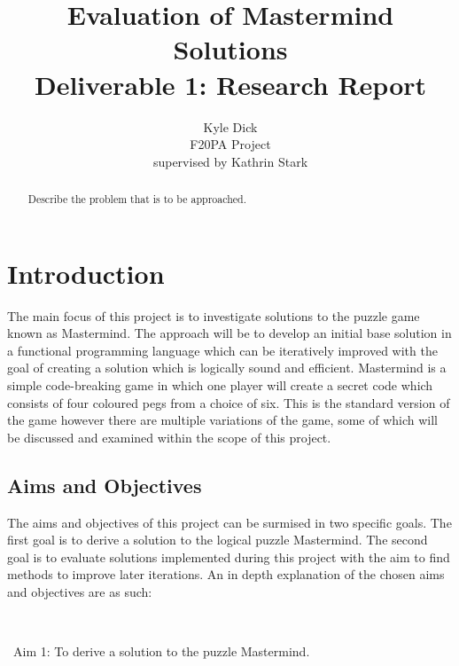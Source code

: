 \documentclass[12pt]{article}  %
\title{Evaluation of Mastermind Solutions\\
Deliverable 1: Research Report}
\author{Kyle Dick\\
F20PA Project\\
supervised by
Kathrin Stark}
\theoremstyle{definition}
\theoremstyle{remark}
\begin{document}
\maketitle

\newpage                     %
\begin{abstract}
Describe the problem that is to be approached.


\end{abstract}

\newpage                     %
\tableofcontents

\newpage                     %
\section{Introduction}\label{s:intro}
%
The main focus of this project is to investigate solutions to the puzzle game known as Mastermind. The approach will be to develop an initial base solution in a functional programming language which can be iteratively improved with the goal of creating a solution which is logically sound and efficient.
Mastermind is a simple code-breaking game in which one player will create a secret code which consists of four coloured pegs from a choice of six. This is the standard version of the game however there are multiple variations of the game, some of which will be discussed and examined within the scope of this project.

\subsection {Aims and Objectives}
The aims and objectives of this project can be surmised in two specific goals. The first goal is to derive a solution to the logical puzzle Mastermind. The second goal is to evaluate solutions implemented during this project with the aim to find methods to improve later iterations. An in depth explanation of the chosen aims and objectives are as such:

\

\textbullet\ Aim 1: To derive a solution to the puzzle Mastermind.
\end{document}
